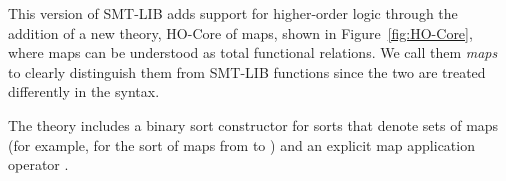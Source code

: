 %


This version of SMT-LIB adds support for higher-order logic through the addition
of a new theory, HO-Core of maps, shown in Figure~\ref{fig:HO-Core},
where maps can be understood as total functional relations.
We call them \emph{maps} to clearly distinguish them
from SMT-LIB functions since the two are treated differently in the syntax.

The theory includes a binary sort constructor \ter{->} for sorts 
that denote sets of maps 
(for example,  for the sort of maps from  to )
and an explicit map application operator .

